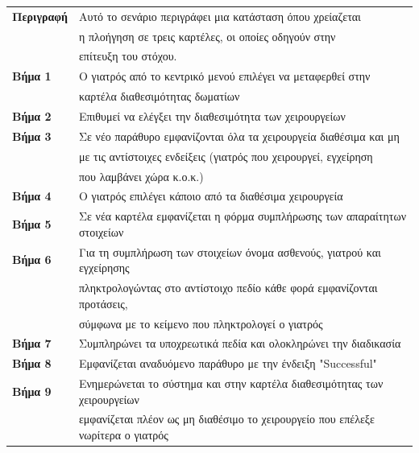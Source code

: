 \documentclass{article}
\newcommand\T{\rule{0pt}{2.6ex}}       %
\newcommand\B{\rule[-1.2ex]{0pt}{0pt}}
\begin{document}
 \begin{center}
     \begin{tabular}{|l|l|}
     \hline
      \textbf{Περιγραφή} & Αυτό το σενάριο περιγράφει μια κατάσταση όπου χρείαζεται \T \\& η πλοήγηση σε τρεις καρτέλες, οι οποίες οδηγούν στην \\& επίτευξη του στόχου. \B \\ 
      \hline
      \textbf{Βήμα 1} & Ο γιατρός από το κεντρικό μενού επιλέγει να μεταφερθεί στην \T \\& καρτέλα διαθεσιμότητας δωματίων \B \\
      \hline
      \textbf{Βήμα 2} & Επιθυμεί να ελέγξει την διαθεσιμότητα των χειρουργείων \T\B \\ 
      \hline
      \textbf{Βήμα 3} & Σε νέο παράθυρο εμφανίζονται όλα τα χειρουργεία διαθέσιμα και μη \T \\& με τις αντίστοιχες ενδείξεις (γιατρός που χειρουργεί, εγχείρηση \\&  που λαμβάνει χώρα κ.ο.κ.) \B \\
      \hline
      \textbf{Βήμα 4} & Ο γιατρός επιλέγει κάποιο από τα διαθέσιμα χειρουργεία \T\B \\
      \hline
      \textbf{Βήμα 5} & Σε νέα καρτέλα εμφανίζεται η φόρμα συμπλήρωσης των απαραίτητων στοιχείων \T\B \\
      \hline
      \textbf{Βήμα 6} & Για τη συμπλήρωση των στοιχείων όνομα ασθενούς, γιατρού και εγχείρησης \T \\& πληκτρολογώντας στο αντίστοιχο πεδίο κάθε φορά εμφανίζονται προτάσεις, \\& σύμφωνα με το κείμενο που πληκτρολογεί ο γιατρός \B \\
      \hline      
      \textbf{Βήμα 7} & Συμπληρώνει τα υποχρεωτικά πεδία και ολοκληρώνει την διαδικασία\T\B \\
      \hline
      \textbf{Βήμα 8} & Εμφανίζεται αναδυόμενο παράθυρο με την ένδειξη "Successful" \T\B \\
      \hline
      \textbf{Βήμα 9} & Ενημερώνεται το σύστημα και στην καρτέλα διαθεσιμότητας των χειρουργείων \T \\& εμφανίζεται πλέον ως μη διαθέσιμο το χειρουργείο που επέλεξε νωρίτερα ο γιατρός \B \\
      \hline
     \end{tabular}
 \end{center}
 
\end{document}
